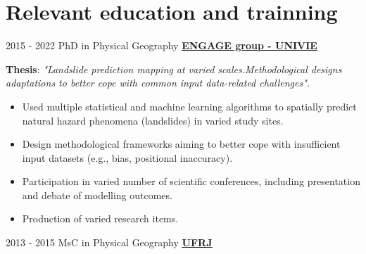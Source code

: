 \documentclass[letterpaper]{twentysecondcv} %
\begin{document}
\section{Relevant education and trainning}
\begin{twenty}
	\twentyitem
    	{2015 - 2022}
		{}
        {  PhD in Physical Geography}
        {\href{https://geographie.univie.ac.at/arbeitsgruppen/engage-geomorphologische-systeme-und-risikoforschung/}{\normalsize  \textbf{\underline{ENGAGE group - UNIVIE}}}}
        {}
        {
       	\hspace{1mm}
       	
       	\textbf{Thesis}: \textit{"Landslide prediction mapping at varied scales.Methodological designs adaptations to better cope with common input data-related challenges".}
        {\begin{itemize}
        \small
        \item Used multiple statistical and machine learning algorithms to spatially predict natural hazard phenomena (landslides) in varied study sites. 
        \item Design methodological frameworks aiming to better cope with insufficient input datasets (e.g., bias, positional inaccuracy). 
        \item Participation in varied number of scientific conferences, including presentation and debate of modelling outcomes.
        \item Production of varied research items.
        \\
        
         \hspace{2mm}
          \hspace{2mm} 
          \hspace{2mm} 
        \mybox[fill=gray!20]{\normalsize \large \LaTeX}  \hspace{2mm}  \hspace{2mm} \vspace{4mm}
		\end{itemize}}
        }
        \twentyitem
    	{2013 - 2015}
		{}
        {  MsC in Physical Geography }
        {\href{https://ufrj.br/en/}{\normalsize  \textbf{\underline{UFRJ}}}}
        {}
        {
       
}
\end{twenty}
\end{document}
